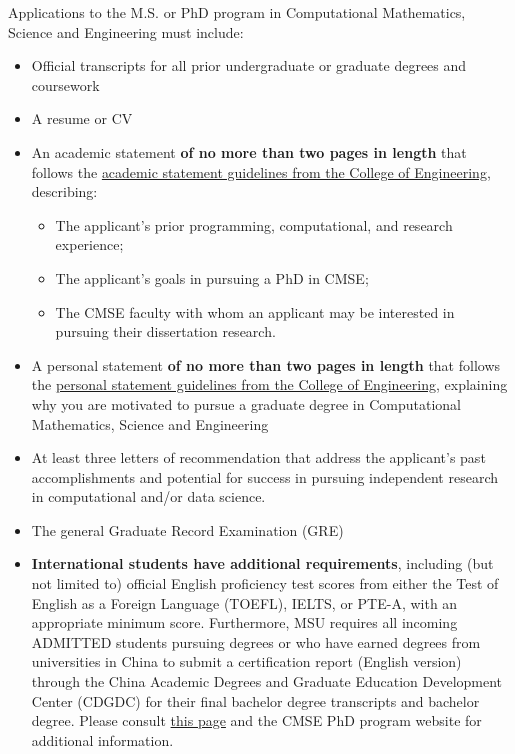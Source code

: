 Applications to the M.S. or PhD program in Computational Mathematics, Science and
Engineering must include:

\begin{itemize}
\item Official transcripts for all prior undergraduate or graduate
  degrees and coursework
\item A resume or CV
\item An academic statement \textbf{of no more than two pages in
    length} that follows the
  \href{http://www.egr.msu.edu/academics/graduate/academic-personal-statements-guidelines/#academic}{academic
    statement
    guidelines from the College of Engineering}, 
  describing:  

\begin{itemize}
  \item The applicant's prior programming, computational, and research experience;  
  \item The applicant's goals in pursuing a PhD in CMSE;  
  \item  The CMSE faculty with whom an applicant may be interested in
    pursuing their dissertation research.  
\end{itemize}

\item A personal statement \textbf{of no more than two pages in
    length} that follows the
  \href{http://www.egr.msu.edu/academics/graduate/academic-personal-statements-guidelines/#personal}{personal
    statement
    guidelines from the College of Engineering}, explaining
why you are motivated to pursue
  a graduate degree in Computational Mathematics, Science and Engineering

\item At least three letters of recommendation that address the
  applicant's past accomplishments and potential for success in
  pursuing independent research in computational and/or data science.

\item The general Graduate Record Examination (GRE)

\item \textbf{International students have additional requirements}, including
  (but not limited to) official English proficiency test scores from
  either the Test of English as a Foreign Language (TOEFL), IELTS, or
  PTE-A, with an appropriate minimum score.  Furthermore, MSU requires all incoming ADMITTED students
  pursuing degrees or who have earned degrees from universities in
  China to submit a certification report (English version) through the
  China Academic Degrees and Graduate Education Development Center
  (CDGDC) for their final bachelor degree transcripts and bachelor
  degree.  Please consult \href{https://grad.msu.edu/internationalapplicants}{this
    page} and the CMSE
  PhD program website for additional information.


\end{itemize}


